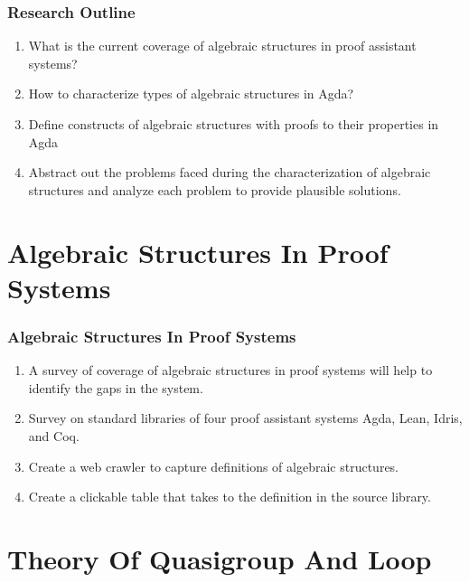 \documentclass[xcolor={dvipsnames}]{beamer}
\begin{document}
\begin{frame}

  \frametitle{Research Outline}

  \begin{enumerate}
    \item What is the current coverage of algebraic structures in proof assistant systems?
    \item How to characterize types of algebraic structures in Agda? 
    \item Define constructs of algebraic structures with proofs to their properties in Agda
    \item Abstract out the problems faced during the characterization of
    algebraic structures and analyze each problem to provide plausible
    solutions.    
  \end{enumerate}

\end{frame}

\section{Algebraic Structures In Proof Systems}

\begin{frame}
  \frametitle{Algebraic Structures In Proof Systems}
  \begin{enumerate}
    \item A survey of coverage of algebraic structures in proof systems will
    help to identify the gaps in the system.
    \item Survey on standard libraries of four proof assistant systems Agda, Lean, Idris, and Coq.
    \item Create a web crawler to capture definitions of algebraic structures.
    \item Create a clickable table that takes to the definition in the source library.
  \end{enumerate}

\end{frame}

\section{Theory Of Quasigroup And Loop}
\end{document}
